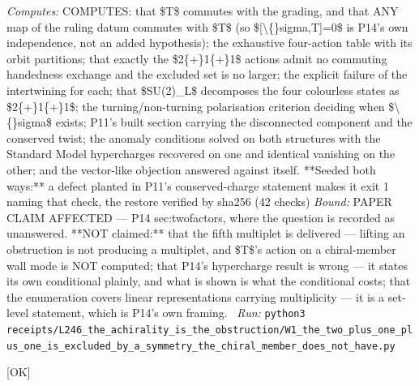 \begin{description}
\emph{Computes:} COMPUTES: that \$T\$ commutes with the grading, and that ANY map of the ruling datum commutes with \$T\$ (so \$[\textbackslash\{\}sigma,T]=0\$ is P14's own independence, not an added hypothesis); the exhaustive four-action table with its orbit partitions; that exactly the \$2\{+\}1\{+\}1\$ actions admit no commuting handedness exchange and the excluded set is no larger; the explicit failure of the intertwining for each; that \$SU(2)\_L\$ decomposes the four colourless states as \$2\{+\}1\{+\}1\$; the turning/non-turning polarisation criterion deciding when \$\textbackslash\{\}sigma\$ exists; P11's built section carrying the disconnected component and the conserved twist; the anomaly conditions solved on both structures with the Standard Model hypercharges recovered on one and identical vanishing on the other; and the vector-like objection answered against itself. **Seeded both ways:** a defect planted in P11's conserved-charge statement makes it exit 1 naming that check, the restore verified by sha256 (42 checks)
 \emph{Bound:} PAPER CLAIM AFFECTED --- P14 sec:twofactors, where the question is recorded as unanswered. **NOT claimed:** that the fifth multiplet is delivered --- lifting an obstruction is not producing a multiplet, and \$T\$'s action on a chiral-member wall mode is NOT computed; that P14's hypercharge result is wrong --- it states its own conditional plainly, and what is shown is what the conditional costs; that the enumeration covers linear representations carrying multiplicity --- it is a set-level statement, which is P14's own framing.
\ \emph{Run:} \texttt{python3 receipts/L246\_the\_achirality\_is\_the\_obstruction/W1\_the\_two\_plus\_one\_plus\_one\_is\_excluded\_by\_a\_symmetry\_the\_chiral\_member\_does\_not\_have.py}
\item[\rcptlabel{P14_the_twist_conjugates_T_it_does_not_project_it}{P14R53}\textbf{P14R53}\quad\texttt{P14\_the\_twist\_conjugates\_T\_it\_does\_not\_project\_it}]\hfill\textsf{[OK]}\\

\end{description}
